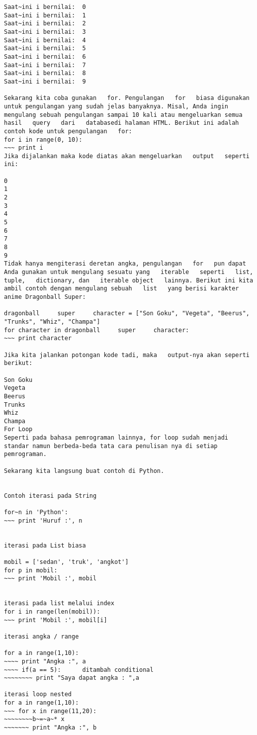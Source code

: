 \begin{verbatim}
Saat~ini i bernilai:  0 
Saat~ini i bernilai:  1 
Saat~ini i bernilai:  2 
Saat~ini i bernilai:  3 
Saat~ini i bernilai:  4 
Saat~ini i bernilai:  5 
Saat~ini i bernilai:  6 
Saat~ini i bernilai:  7 
Saat~ini i bernilai:  8 
Saat~ini i bernilai:  9 

Sekarang kita coba gunakan   for. Pengulangan   for   biasa digunakan untuk pengulangan yang sudah jelas banyaknya. Misal, Anda ingin mengulang sebuah pengulangan sampai 10 kali atau mengeluarkan semua hasil   query   dari   databasedi halaman HTML. Berikut ini adalah contoh kode untuk pengulangan   for: 
for i in range(0, 10): 
~~~ print i 
Jika dijalankan maka kode diatas akan mengeluarkan   output   seperti ini: 

0 
1 
2 
3 
4 
5 
6 
7 
8 
9 
Tidak hanya mengiterasi deretan angka, pengulangan   for   pun dapat Anda gunakan untuk mengulang sesuatu yang   iterable   seperti   list,   tuple,   dictionary, dan   iterable object   lainnya. Berikut ini kita ambil contoh dengan mengulang sebuah   list   yang berisi karakter anime Dragonball Super: 

dragonball     super     character = ["Son Goku", "Vegeta", "Beerus", "Trunks", "Whiz", "Champa"] 
for character in dragonball     super     character: 
~~~ print character 

Jika kita jalankan potongan kode tadi, maka   output-nya akan seperti berikut: 

Son Goku 
Vegeta 
Beerus 
Trunks 
Whiz 
Champa 
For Loop 
Seperti pada bahasa pemrograman lainnya, for loop sudah menjadi standar namun berbeda-beda tata cara penulisan nya di setiap pemrograman. 

Sekarang kita langsung buat contoh di Python.    


Contoh iterasi pada String  

for~n in 'Python':   
~~~ print 'Huruf :', n 

  
iterasi pada List biasa 

mobil = ['sedan', 'truk', 'angkot']  
for p in mobil: 
~~~ print 'Mobil :', mobil 


iterasi pada list melalui index 
for i in range(len(mobil)): 
~~~ print 'Mobil :', mobil[i] 

iterasi angka / range 

for a in range(1,10): 
~~~~ print "Angka :", a 
~~~~ if(a == 5):      ditambah conditional 
~~~~~~~~ print "Saya dapat angka : ",a 

iterasi loop nested 
for a in range(1,10): 
~~~ for x in range(11,20): 
~~~~~~~~b~=~a~* x      
~~~~~~~ print "Angka :", b 


\end{verbatim}

